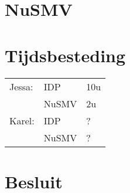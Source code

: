 \documentclass[a4paper,12pt]{article}
\begin{document}
\section{NuSMV}

\section{Tijdsbesteding}
\begin{tabular}{l l l}
Jessa: 	& IDP 	& 10u\\
		& NuSMV 	& 2u\\
Karel: 	& IDP 	& ?\\
		& NuSMV 	& ?\\
\end{tabular}

\section{Besluit}
\end{document}
